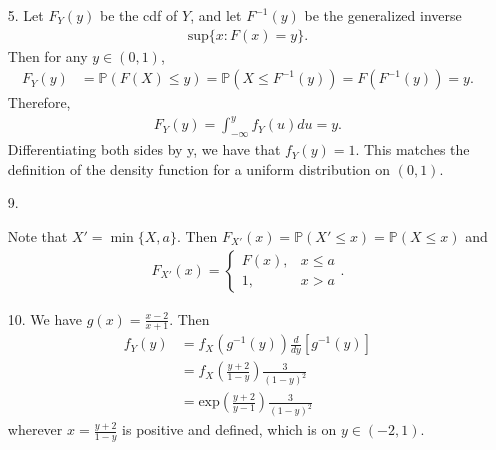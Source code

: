 \documentclass[a4paper,12pt]{article}
\begin{document}
\begin{enumerate}
    \item[5.] 
        Let $F_Y(y)$ be the cdf of $Y$, and let $F^{-1}(y)$ be the generalized inverse
        \begin{align*}
            \text{sup}\{x : F(x) = y\}.
        \end{align*}
        Then for any $y \in (0, 1)$,
        \begin{align*}
            F_Y(y) &= \mathbb{P}(F(X) \leq y) = \mathbb{P}(X \leq F^{-1}(y)) = F(F^{-1}(y)) = y.
        \end{align*}
        Therefore,
        \begin{align*}
            F_Y(y) = \int_{-\infty}^y f_Y(u) du = y.
        \end{align*}
        Differentiating both sides by y, we have that $f_Y(y) = 1$. This matches the definition of the density function for a uniform distribution on $(0, 1)$.

    \item[9.] 
        \iffalse
        When directly truncated, the distribution $F_X(\omega)$ becomes
        \begin{align*}
            \begin{cases}
                F_X(\omega), & \omega \leq X^{-1}(a) \\
                F_X(X^{-1}(a)), & \omega > X^{-1}(a)
            \end{cases}
        \end{align*}
        where $X^{-1}(a)$ is the generalized inverse defined as before. Normalizing allows us to obtain
        \begin{align*}
            F_{X'}(\omega) =
            \begin{cases}
                \frac{F_X(\omega)}{F_X(X^{-1}(a))}, & \omega \leq X^{-1}(a) \\
                1, & \omega > X^{-1}(a)
            \end{cases}.
        \end{align*}
        \fi
        Note that $X' = \min\{X, a\}$. Then $F_{X'}(x) = \mathbb{P}(X' \leq x) = \mathbb{P}(X \leq x)$ and
        \begin{align*}
            F_{X'}(x) =
            \begin{cases}
                F(x), & x \leq a \\
                1, & x > a
            \end{cases}.
        \end{align*}

    \item[10.] We have $g(x) = \frac{x - 2}{x + 1}$. Then
        \begin{align*}
            f_Y(y) &= f_X(g^{-1}(y)) \frac{d}{dy}[g^{-1}(y)] \\
            &= f_X \left( \frac{y + 2}{1 - y} \right) \frac{3}{(1 - y)^2} \\
            &= \text{exp} \left( \frac{y + 2}{y - 1} \right) \frac{3}{(1 - y)^2}
        \end{align*}
        wherever $x = \frac{y + 2}{1 - y}$ is positive and defined, which is on $y \in (-2, 1)$.


\end{enumerate}
\end{document}
